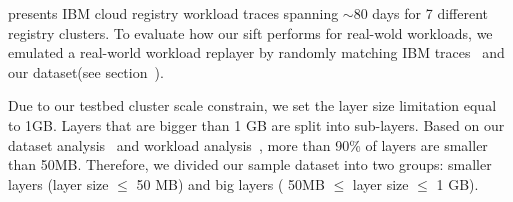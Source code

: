 \cite{xxx} presents IBM cloud registry workload traces spanning $\sim$80 days for 7 different registry clusters. 
To evaluate how our sift performs for real-wold workloads,
we emulated a real-world workload replayer by randomly matching IBM traces~\cite{xxx} and our dataset(see section~\cite{xxx}). 

Due to our testbed cluster scale constrain, we set the layer size limitation equal to 1GB. 
Layers that are bigger than 1 GB are split into sub-layers.
Based on our dataset analysis~\cite{xxx} and workload analysis~\cite{xxx},
more than 90\% of layers are smaller than 50MB. 
Therefore, we divided our sample dataset into two groups:
smaller layers (layer size $\leq$ 50 MB) and big layers ( 50MB $\leq$ layer size $\leq$ 1 GB).



